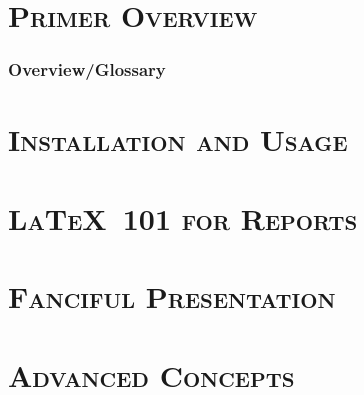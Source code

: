 \def \uswdwmspkg{\texttt{uswdwms} package}

\pagebreak
\part{\textsc{Primer Overview}}

\pagebreak
\section{Overview/Glossary}
\pagebreak
\part{\textsc{Installation and Usage}}

\pagebreak
\part{\textsc{\LaTeX\ 101 for Reports}}

\pagebreak
\part{\textsc{Fanciful Presentation}}

\pagebreak
\part{\textsc{Advanced Concepts}}

\pagebreak

